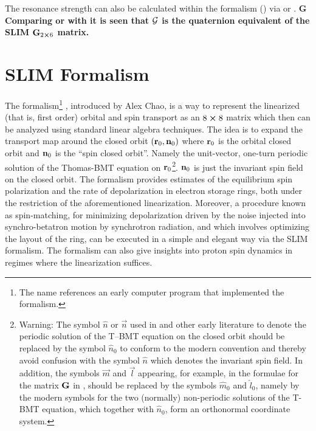 The resonance strength can also be calculated within the  formalism () via
 or . \bf{\cal G} Comparing  or  with  it is seen
that $\bf{\cal G}$ is the quaternion equivalent of the SLIM ${\bf G}_{2\mathbin{\boldsymbol{\times}}6}$ matrix.

\section{SLIM Formalism}
\label{s:slim}

The  formalism\footnote
  {
The name references an early computer program that implemented the formalism.
  }
\cite{b:chao.spin,b:barber99}, introduced by Alex Chao, is a way to represent the linearized (that
is, first order) orbital and spin transport as an $8 \mathbin{\boldsymbol{\times}} 8$ matrix which then can be analyzed
using standard linear algebra techniques. The idea is to expand the transport map around the closed
orbit $({\bf r}_0, {\bf n}_0)$ where ${\bf r}_0$ is the orbital closed orbit and ${\bf n}_0$ is the ``spin
closed orbit''. Namely the unit-vector, one-turn periodic solution of the Thomas-BMT equation on
${\bf r}_0$\footnote
  {
Warning: The symbol $\hat n$ or
$\vec n$ used in \cite{b:chao.spin,b:barber85} and other early literature to denote the periodic
solution of the T--BMT equation on the closed orbit should be replaced by the symbol $\hat n_0$ to
conform to the modern convention \cite{b:barber99} and thereby avoid confusion with the symbol $\hat
n$ which denotes the invariant spin field.  In addition, the symbols $\vec m$ and $\vec l$
appearing, for example, in the formulae for the matrix ${\bf G}$ in \cite{b:barber85}, should be
replaced by the symbols $\hat m_0$ and $\hat l_0$, namely by the modern symbols for the two
(normally) non-periodic solutions of the T-BMT equation, which together with $\hat n_0$, form an
orthonormal coordinate system.
  }.
% 
${\bf n}_0$ is just the invariant spin field on the closed orbit. The formalism provides estimates of
the equilibrium spin polarization and the rate of depolarization in electron storage rings, both
under the restriction of the aforementioned linearization. Moreover, a procedure known as
spin-matching, for minimizing depolarization driven by the noise injected into synchro-betatron
motion by synchrotron radiation, and which involves optimizing the layout of the ring, can be
executed in a simple and elegant way via the SLIM formalism. The formalism can also give insights
into proton spin dynamics in regimes where the linearization suffices.

